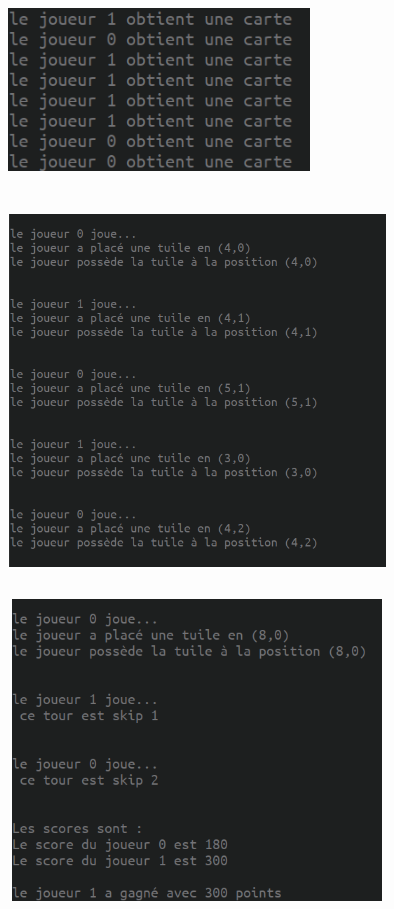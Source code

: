 \documentclass[12pt,a4paper]{extarticle}
\begin{document}
    \begin{figure}[h!]
        \centering
        \includegraphics[height=5cm,width=8cm]{img/rendu1}
    \end{figure}

    \begin{figure}[h!]
        \centering
        \includegraphics[height=10cm,width=10cm]{img/rendu2}
    \end{figure}

    \begin{figure}[h!]
        \centering
        \includegraphics[height=8cm,width=10cm]{img/rendu3}
    \end{figure}
\end{document}
